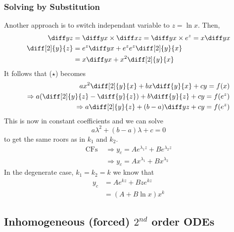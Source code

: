 \documentclass{article}
\begin{document}
\subsubsection*{Solving by Substitution}
Another approach is to switch independant variable to $z = \ln x$. Then, 
\begin{align*}
    \diff yz &= \diff yx \times \diff xz = \diff yx \times e^z = x \diff yx \\
    \diff[2]{y}{z} &= e^z \diff yx + e^z e^z \diff[2]{y}{x} \\
    &= x \diff yx + x^2 \diff[2]{y}{x}
\end{align*}
It follows that ($\star$) becomes
\begin{align*}
    a x^2 \diff[2]{y}{x} + b x \diff{y}{x} + cy = f(x) \\
    \Rightarrow a (\diff[2]{y}{z} - \diff{y}{z}) + b \diff{y}{z} + cy = f(e^z) \\
    \Rightarrow a \diff[2]{y}{z} + (b-a)\diff yz + cy = f(e^z)
\end{align*}
This is now in constant coefficients and we can solve
\[
    a \lambda^2 + (b-a) \lambda + c = 0
\]
to get the same roors as in $k_1$ and $k_2$.
\begin{align*}
    \text{CFs } &\Rightarrow y_c = A e^{\lambda_1 z} + B e^{\lambda_2 z} \\
    &\Rightarrow y_c = A x^{\lambda_1} + B x^{\lambda_2}
\end{align*}
In the degenerate case, $k_1 = k_2 = k$ we know that
\begin{align*}
    y_c &= A e^{k z} + B z e^{k z} \\
    &= (A + B \ln x) x^k
\end{align*}
\subsection{Inhomogeneous (forced) $2^{nd}$ order ODEs}
\end{document}
